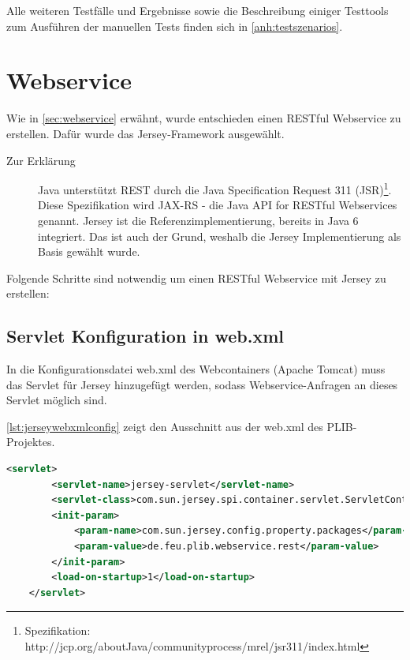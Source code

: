Alle weiteren Testfälle und Ergebnisse sowie die Beschreibung einiger Testtools zum Ausführen der manuellen Tests finden sich in \autoref{anh:testszenarios}.

\section{Webservice}\label{kap:webservice}

Wie in \autoref{sec:webservice} erwähnt, wurde entschieden einen \gls{REST}ful \gls{Webservice} zu erstellen. Dafür wurde das \gls{Jersey}-Framework ausgewählt. 

\begin{description}
\item[Zur Erklärung] Java unterstützt REST durch die Java Specification Request 311 (JSR)\footnote{Spezifikation: http://jcp.org/aboutJava/communityprocess/mrel/jsr311/index.html}. Diese Spezifikation wird JAX-RS - die Java API for RESTful Webservices genannt. Jersey ist die Referenzimplementierung, bereits in Java 6 integriert. Das ist auch der Grund, weshalb die Jersey Implementierung als Basis gewählt wurde.  
\end{description}

Folgende Schritte sind notwendig um einen \gls{REST}ful Webservice mit Jersey zu erstellen: 

\subsection{Servlet Konfiguration in web.xml} 

In die Konfigurationsdatei web.xml des Webcontainers (\gls{Apache Tomcat}) muss das \gls{Servlet} für \gls{Jersey} hinzugefügt werden, sodass \gls{Webservice}-Anfragen an dieses \gls{Servlet} möglich sind. 

\autoref{lst:jerseywebxmlconfig} zeigt den Ausschnitt aus der web.xml des \gls{PLIB}-Projektes. 

 \begin{lstlisting}[caption=Jersey Servlet Konfiguration in web.xml, language=XML, label=lst:jerseywebxmlconfig]
    <servlet>
        <servlet-name>jersey-servlet</servlet-name>
        <servlet-class>com.sun.jersey.spi.container.servlet.ServletContainer</servlet-class>
        <init-param>
            <param-name>com.sun.jersey.config.property.packages</param-name>
            <param-value>de.feu.plib.webservice.rest</param-value>
        </init-param>
        <load-on-startup>1</load-on-startup>
    </servlet>
 \end{lstlisting}   
 
